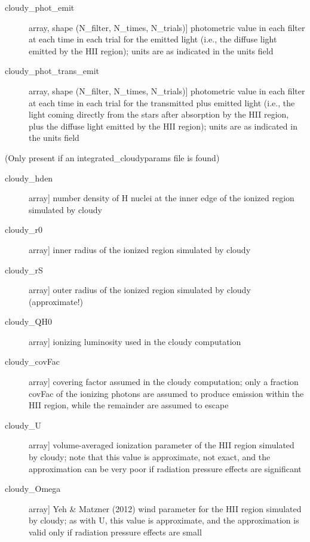 \documentclass[letterpaper,10pt,english]{sphinxmanual}
\begin{document}
\begin{fulllineitems}
\begin{description}
\begin{description}
\item[{cloudy\_phot\_emit}] \leavevmode{[}array, shape (N\_filter, N\_times, N\_trials){]}
photometric value in each filter at each time in each trial for
the emitted light (i.e., the diffuse light emitted by the HII
region); units are as indicated in the units field

\item[{cloudy\_phot\_trans\_emit}] \leavevmode{[}array, shape (N\_filter, N\_times, N\_trials){]}
photometric value in each filter at each time in each trial for
the transmitted plus emitted light (i.e., the light coming
directly from the stars after absorption by the HII region,
plus the diffuse light emitted by the HII region); units are as
indicated in the units field

\end{description}

(Only present if an integrated\_cloudyparams file is found)
\begin{description}
\item[{cloudy\_hden}] \leavevmode{[}array{]}
number density of H nuclei at the inner edge of the ionized
region simulated by cloudy

\item[{cloudy\_r0}] \leavevmode{[}array{]}
inner radius of the ionized region simulated by cloudy

\item[{cloudy\_rS}] \leavevmode{[}array{]}
outer radius of the ionized region simulated by cloudy (approximate!)

\item[{cloudy\_QH0}] \leavevmode{[}array{]}
ionizing luminosity used in the cloudy computation

\item[{cloudy\_covFac}] \leavevmode{[}array{]}
covering factor assumed in the cloudy computation; only a
fraction covFac of the ionizing photons are assumed to
produce emission within the HII region, while the remainder
are assumed to escape

\item[{cloudy\_U}] \leavevmode{[}array{]}
volume-averaged ionization parameter of the HII region
simulated by cloudy; note that this value is approximate,
not exact, and the approximation can be very poor if
radiation pressure effects are significant

\item[{cloudy\_Omega}] \leavevmode{[}array{]}
Yeh \& Matzner (2012) wind parameter for the HII region
simulated by cloudy; as with U, this value is approximate,
and the approximation is valid only if radiation pressure
effects are small

\end{description}

\end{description}

\end{fulllineitems}
\end{document}

